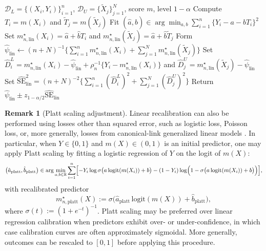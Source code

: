 \documentclass{article}
\theoremstyle{plain}
\theoremstyle{definition}
\newtheorem{remark}{Remark}
\newcommand{\R}{\mathbb{R}}
\newcommand{\1}{\mathbbm{1}}
\newcommand{\mhat}{m}
\newcommand{\rhon}{\rho_n}
\begin{document}
\begin{algorithm}[t]
\caption{Linearly calibrated plug-in estimator}
\label{alg:linearppi}
\begin{algorithmic}[1]
\Require \(\mathcal D_L=\{(X_i,Y_i)\}_{i=1}^n\), \(\mathcal D_U=\{\widetilde X_j\}_{j=1}^N\), score \(\mhat\), level \(1-\alpha\)
\State Compute \(T_i=\mhat(X_i)\) and \(\widetilde T_j=\mhat(\widetilde X_j)\)
\State Fit \((\hat a,\hat b)\in\arg\min_{a,b}\sum_{i=1}^n\{Y_i-a-bT_i\}^2\)
\State Set \(m_{n,\mathrm{lin}}^\star(X_i)=\hat a+\hat bT_i\) and \(m_{n,\mathrm{lin}}^\star(\widetilde X_j)=\hat a+\hat b\widetilde T_j\)
\State Form \(\widehat\psi_{\mathrm{lin}}\gets (n+N)^{-1}\{\sum_{i=1}^n m_{n,\mathrm{lin}}^\star(X_i)+\sum_{j=1}^N m_{n,\mathrm{lin}}^\star(\widetilde X_j)\}\)
\State Set \(\widehat D_i^L=m_{n,\mathrm{lin}}^\star(X_i)-\widehat\psi_{\mathrm{lin}}+\rhon^{-1}\{Y_i-m_{n,\mathrm{lin}}^\star(X_i)\}\) and \(\widehat D_j^U=m_{n,\mathrm{lin}}^\star(\widetilde X_j)-\widehat\psi_{\mathrm{lin}}\)
\State Set \(\widehat{\mathrm{SE}}_{\mathrm{lin}}^2=(n+N)^{-2}\{\sum_{i=1}^n(\widehat D_i^L)^2+\sum_{j=1}^N(\widehat D_j^U)^2\}\)
\State Return \(\widehat\psi_{\mathrm{lin}} \pm z_{1-\alpha/2}\widehat{\mathrm{SE}}_{\mathrm{lin}}\)
\end{algorithmic}
\end{algorithm}

\begin{remark}[Platt scaling adjustment]
Linear recalibration can also be performed using losses other than squared error, such as logistic loss, Poisson loss, or, more generally, losses from canonical-link generalized linear models \citep{rosenblum2009using}. In particular, when \(Y\in\{0,1\}\) and \(\mhat(X)\in(0,1)\) is an initial predictor, one may apply Platt scaling \citep{cox1958two,platt1999probabilistic} by fitting a logistic regression of \(Y\) on the logit of \(\mhat(X)\):
\begin{equation}
\label{eq:platt-cal}
\bigl(\hat a_{\mathrm{platt}},\hat b_{\mathrm{platt}}\bigr)
\in
\arg\min_{a,b\in\R}
\sum_{i=1}^n
\Bigl[
-Y_i \log \sigma\bigl(a\,\mathrm{logit}(\mhat(X_i))+b\bigr)
-(1-Y_i)\log\Bigl(1-\sigma\bigl(a\,\mathrm{logit}(\mhat(X_i))+b\bigr)\Bigr)
\Bigr],
\end{equation}
with recalibrated predictor
\[
m_{n,\mathrm{platt}}^\star(X)
:=
\sigma\bigl(\hat a_{\mathrm{platt}}\,\mathrm{logit}(\mhat(X))+\hat b_{\mathrm{platt}}\bigr),
\]
where \(\sigma(t):=(1+e^{-t})^{-1}\). Platt scaling may be preferred over linear regression calibration when predictors exhibit over- or under-confidence, in which case calibration curves are often approximately sigmoidal. More generally, outcomes can be rescaled to \([0,1]\) before applying this procedure.
\end{remark}
\end{document}

